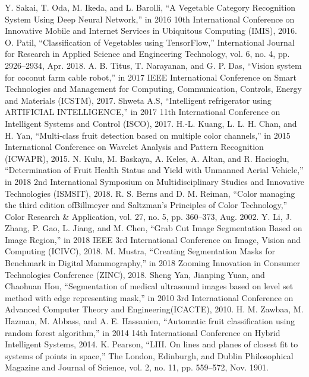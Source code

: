\documentclass[conference,table]{IEEEtran}
\begin{document}
\begin{thebibliography}{00}
		 Y. Sakai, T. Oda, M. Ikeda, and L. Barolli, ``A Vegetable Category Recognition System Using Deep Neural Network,'' in 2016 10th International Conference on Innovative Mobile and Internet Services in Ubiquitous Computing (IMIS), 2016.
		 O. Patil, ``Classification of Vegetables using TensorFlow,'' International Journal for Research in Applied Science and Engineering Technology, vol. 6, no. 4, pp. 2926–2934, Apr. 2018.
		 A. B. Titus, T. Narayanan, and G. P. Das, ``Vision system for coconut farm cable robot,'' in 2017 IEEE International Conference on Smart Technologies and Management for Computing, Communication, Controls, Energy and Materials (ICSTM), 2017.
		 Shweta A.S, ``Intelligent refrigerator using ARTIFICIAL INTELLIGENCE,'' in 2017 11th International Conference on Intelligent Systems and Control (ISCO), 2017.
		 H.-L. Kuang, L. L. H. Chan, and H. Yan, ``Multi-class fruit detection based on multiple color channels,'' in 2015 International Conference on Wavelet Analysis and Pattern Recognition (ICWAPR), 2015.
		 N. Kulu, M. Baskaya, A. Keles, A. Altan, and R. Hacioglu, ``Determination of Fruit Health Status and Yield with Unmanned Aerial Vehicle,'' in 2018 2nd International Symposium on Multidisciplinary Studies and Innovative Technologies (ISMSIT), 2018.
		 R. S. Berns and D. M. Reiman, ``Color managing the third edition ofBillmeyer and Saltzman’s Principles of Color Technology,'' Color Research \& Application, vol. 27, no. 5, pp. 360–373, Aug. 2002.
		 Y. Li, J. Zhang, P. Gao, L. Jiang, and M. Chen, ``Grab Cut Image Segmentation Based on Image Region,'' in 2018 IEEE 3rd International Conference on Image, Vision and Computing (ICIVC), 2018.
		 M. Mustra, ``Creating Segmentation Masks for Benchmark in Digital Mammography,'' in 2018 Zooming Innovation in Consumer Technologies Conference (ZINC), 2018.
		 Sheng Yan, Jianping Yuan, and Chaohuan Hou, ``Segmentation of medical ultrasound images based on level set method with edge representing mask,'' in 2010 3rd International Conference on Advanced Computer Theory and Engineering(ICACTE), 2010.
		 H. M. Zawbaa, M. Hazman, M. Abbass, and A. E. Hassanien, ``Automatic fruit classification using random forest algorithm,'' in 2014 14th International Conference on Hybrid Intelligent Systems, 2014.
		 K. Pearson, ``LIII. On lines and planes of closest fit to systems of points in space,'' The London, Edinburgh, and Dublin Philosophical Magazine and Journal of Science, vol. 2, no. 11, pp. 559–572, Nov. 1901.

\end{thebibliography}
\end{document}
